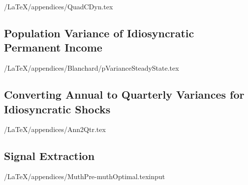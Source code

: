 \documentclass[titlepage]{\econtex}\newcommand{\texname}{cAndCwithStickyE}
\begin{document}
\econtexRoot/LaTeX/appendices/QuadCDyn.tex




%


\subsection{Population Variance of Idiosyncratic Permanent Income}\label{appendix:pss}

\econtexRoot/LaTeX/appendices/Blanchard/pVarianceSteadyState.tex

\subsection{Converting Annual to Quarterly Variances for Idiosyncratic Shocks}\label{appendix:Ann2Qtr}

\econtexRoot/LaTeX/appendices/Ann2Qtr.tex

\subsection{\cite{muthOptimal} Signal Extraction}\label{appendix:Muth}

\econtexRoot/LaTeX/appendices/MuthPre-muthOptimal.texinput
\end{document}
